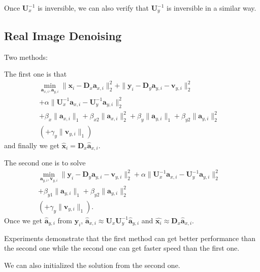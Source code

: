 \documentclass[10pt,twocolumn,letterpaper]{article}
\begin{document}
Once $\mathbf{U}_{x}^{-1}$ is inversible, we can also verify that $\mathbf{U}_{y}^{-1}$ is inversible in a similar way. 

\subsection{Real Image Denoising}
Two methods:

The first one is that
\begin{equation}
\begin{split}
\min_{\mathbf{a}_{x,i},\mathbf{a}_{y,i}}
\|\mathbf{x}_{i}-\mathbf{D}_{x}\mathbf{a}_{x,i}\|_{2}^{2}
+
\|\mathbf{y}_{i}-\mathbf{D}_{y}\mathbf{a}_{y,i}-\mathbf{v}_{y,i}\|_{2}^{2}
\\
+
\alpha
\|\mathbf{U}_{x}^{-1}\mathbf{a}_{x,i}-\mathbf{U}_{y}^{-1}\mathbf{a}_{y,i}\|_{2}^{2}&
\\
+
\beta_{x}\|\mathbf{a}_{x,i}\|_{1}
+
\beta_{x2}\|\mathbf{a}_{x,i}\|_{2}^{2}
+
\beta_{y}\|\mathbf{a}_{y,i}\|_{1}
+
\beta_{y2}\|\mathbf{a}_{y,i}\|_{2}^{2}
&
\\
(+
\gamma_{y}\|\mathbf{v}_{y,i}\|_{1})
\end{split}
\end{equation}
and finally we get $\widehat{\mathbf{x}}_{i}=\mathbf{D}_{x}\widehat{\mathbf{a}}_{x,i}$.

The second one is to solve
\begin{equation}
\begin{split}
\min_{\mathbf{a}_{y,i},\mathbf{v}_{y,i}}
\|\mathbf{y}_{i}-\mathbf{D}_{y}\mathbf{a}_{y,i}-\mathbf{v}_{y,i}\|_{2}^{2}
+
\alpha
\|\mathbf{U}_{x}^{-1}\mathbf{a}_{x,i}-\mathbf{U}_{y}^{-1}\mathbf{a}_{y,i}\|_{2}^{2}&
\\
+
\beta_{y1}\|\mathbf{a}_{y,i}\|_{1}
+
\beta_{y2}\|\mathbf{a}_{y,i}\|_{2}^{2}
&
\\
(+
\gamma_{y}\|\mathbf{v}_{y,i}\|_{1}).
\end{split}
\end{equation}
Once we get $\widehat{\mathbf{a}}_{y,i}$ from $\mathbf{y}_{i}$, $\widehat{\mathbf{a}}_{x,i}\approx\mathbf{U}_{x}\mathbf{U}_{y}^{-1}\widehat{\mathbf{a}}_{y,i}$ and $\widehat{\mathbf{x}_{i}}\approx\mathbf{D}_{x}\widehat{\mathbf{a}}_{x,i}$.

Experiments demonstrate that the first method can get better performance than the second one while the second one can get faster speed than the first one.

We can also initialized the solution from the second one. 
\end{document}
